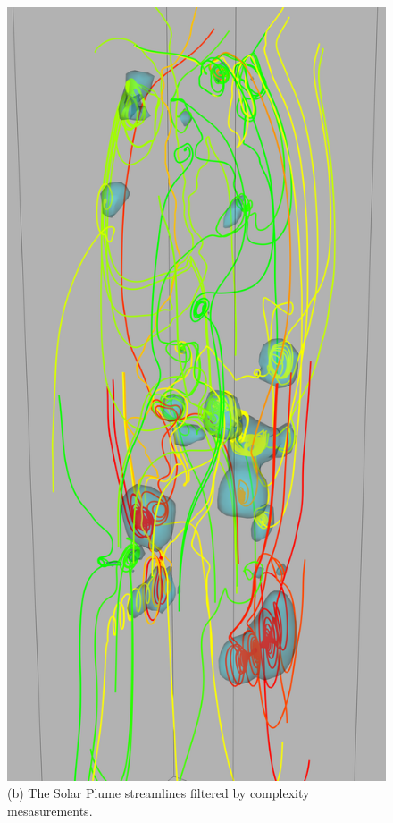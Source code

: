 \documentclass[journal]{vgtc}                %
\begin{document}
\begin{figure}[t]
\begin{minipage}{0.47\linewidth}
		\end{minipage}
		\begin{minipage}{0.47\linewidth}
			\centering \small
			\includegraphics[height = 2\linewidth]{Images/plume_iso_crop.png}\\(b) The Solar Plume streamlines filtered by complexity mesasurements. \vspace{0.2em}

\end{minipage}
\end{figure}
\end{document}
